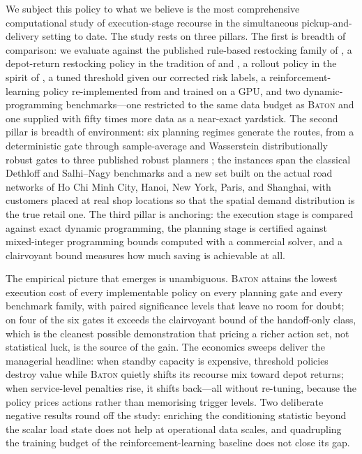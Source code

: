 \documentclass[preprint,authoryear,12pt]{elsarticle}
\theoremstyle{definition}
\theoremstyle{remark}
\begin{document}
We subject this policy to what we believe is the most comprehensive
computational study of execution-stage recourse in the simultaneous
pickup-and-delivery setting to date. The study rests on three pillars.
The first is breadth of comparison: we evaluate against the published
rule-based restocking family of \citet{salavati2019rule}, a depot-return
restocking policy in the tradition of \citet{florio2020new} and
\citet{legault2025superadditivity}, a rollout policy in the spirit of
\citet{secomandi2001rollout}, a tuned threshold given our corrected risk
labels, a reinforcement-learning policy re-implemented from
\citet{iklassov2024rl} and trained on a GPU, and two dynamic-programming
benchmarks---one restricted to the same data budget as \textsc{Baton}
and one supplied with fifty times more data as a near-exact yardstick.
The second pillar is breadth of environment: six planning regimes
generate the routes, from a deterministic gate through sample-average
and Wasserstein distributionally robust gates to three published robust
planners \citep{gounaris2013robust,bertsimas2004price,ghosal2024unifying};
the instances span the classical Dethloff and Salhi--Nagy benchmarks and
a new set built on the actual road networks of Ho Chi Minh City, Hanoi,
New York, Paris, and Shanghai, with customers placed at real shop
locations so that the spatial demand distribution is the true retail
one. The third pillar is anchoring: the execution stage is compared
against exact dynamic programming, the planning stage is certified
against mixed-integer programming bounds computed with a commercial
solver, and a clairvoyant bound measures how much saving is achievable
at all.

The empirical picture that emerges is unambiguous.
\textsc{Baton} attains the lowest execution cost of every implementable
policy on every planning gate and every benchmark family, with paired
significance levels that leave no room for doubt; on four of the six
gates it exceeds the clairvoyant bound of the handoff-only class,
which is the cleanest possible demonstration that pricing a richer
action set, not statistical luck, is the source of the gain. The
economics sweeps deliver the managerial headline: when standby capacity
is expensive, threshold policies destroy value while \textsc{Baton}
quietly shifts its recourse mix toward depot returns; when service-level
penalties rise, it shifts back---all without re-tuning, because the
policy prices actions rather than memorising trigger levels. Two
deliberate negative results round off the study: enriching the
conditioning statistic beyond the scalar load state does not help at
operational data scales, and quadrupling the training budget of the
reinforcement-learning baseline does not close its gap.
\end{document}
